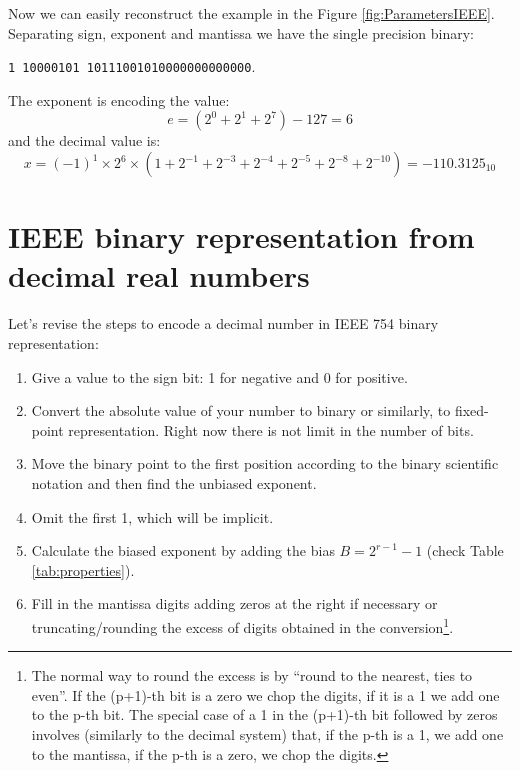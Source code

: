  
 

Now we can easily reconstruct the example in the Figure \ref{fig:ParametersIEEE}. Separating sign, exponent and mantissa we have the single precision binary: 

\texttt{1 10000101 10111001010000000000000}. 

The exponent is encoding the value:
$$
e = ( 2^0 + 2^1 + 2^7 ) - 127 = 6
$$
and the decimal value is:
$$
x = (-1)^1 \times 2^6 \times ( 1 + 2^{-1} + 2^{-3} + 2^{-4} + 2^{-5} + 2^{-8} + 2^{-10} ) = -110.3125_{10}
$$





    \section{IEEE binary representation from decimal real numbers}

Let's revise the steps to encode a decimal number in IEEE 754 binary representation:

\begin{enumerate}
    \item Give a value to the sign bit: 1 for negative and 0 for positive.
    
    \item Convert the absolute value of your number to binary or similarly, to fixed-point representation. Right now there is not limit in the number of bits. 
      
    \item Move the binary point to the first position according to the binary scientific notation and then find the unbiased exponent.
    
    \item Omit the first 1, which will be implicit.
    
    \item Calculate the biased exponent by adding the bias $B = 2^{r-1}-1$ (check Table \ref{tab:properties}).
    
    \item Fill in the mantissa digits adding zeros at the right if necessary or truncating/rounding the excess of digits obtained in the conversion\footnote{The normal way to round the excess is by ``round to the nearest, ties to even''. If the (p+1)-th bit is a zero we chop the digits, if it is a 1 we add one to the p-th bit. The special case of a 1 in the (p+1)-th bit followed by zeros involves (similarly to the decimal system) that, if the p-th is a 1, we add one to the mantissa, if the p-th is a zero, we chop the digits.}.
\end{enumerate}




